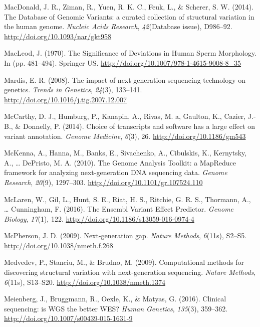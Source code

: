 \documentclass[12pt,twoside]{reedthesis}
\theoremstyle{definition}
\theoremstyle{definition}
\theoremstyle{remark}
\begin{document}
  \hypertarget{ref-MacDonald2014}{}
  MacDonald, J. R., Ziman, R., Yuen, R. K. C., Feuk, L., \& Scherer, S. W.
  (2014). The Database of Genomic Variants: a curated collection of
  structural variation in the human genome. \emph{Nucleic Acids Research},
  \emph{42}(Database issue), D986--92.
  \url{http://doi.org/10.1093/nar/gkt958}
  
  \hypertarget{ref-MacLeod1970}{}
  MacLeod, J. (1970). The Significance of Deviations in Human Sperm
  Morphology. In (pp. 481--494). Springer US.
  \url{http://doi.org/10.1007/978-1-4615-9008-8_35}
  
  \hypertarget{ref-Mardis2008}{}
  Mardis, E. R. (2008). The impact of next-generation sequencing
  technology on genetics. \emph{Trends in Genetics}, \emph{24}(3),
  133--141. \url{http://doi.org/10.1016/j.tig.2007.12.007}
  
  \hypertarget{ref-McCarthy2014}{}
  McCarthy, D. J., Humburg, P., Kanapin, A., Rivas, M. a, Gaulton, K.,
  Cazier, J.-B., \& Donnelly, P. (2014). Choice of transcripts and
  software has a large effect on variant annotation. \emph{Genome
  Medicine}, \emph{6}(3), 26. \url{http://doi.org/10.1186/gm543}
  
  \hypertarget{ref-McKenna2010}{}
  McKenna, A., Hanna, M., Banks, E., Sivachenko, A., Cibulskis, K.,
  Kernytsky, A., \ldots{} DePristo, M. A. (2010). The Genome Analysis
  Toolkit: a MapReduce framework for analyzing next-generation DNA
  sequencing data. \emph{Genome Research}, \emph{20}(9), 1297--303.
  \url{http://doi.org/10.1101/gr.107524.110}
  
  \hypertarget{ref-McLaren2016}{}
  McLaren, W., Gil, L., Hunt, S. E., Riat, H. S., Ritchie, G. R. S.,
  Thormann, A., \ldots{} Cunningham, F. (2016). The Ensembl Variant Effect
  Predictor. \emph{Genome Biology}, \emph{17}(1), 122.
  \url{http://doi.org/10.1186/s13059-016-0974-4}
  
  \hypertarget{ref-McPherson2009}{}
  McPherson, J. D. (2009). Next-generation gap. \emph{Nature Methods},
  \emph{6}(11s), S2--S5. \url{http://doi.org/10.1038/nmeth.f.268}
  
  \hypertarget{ref-Medvedev2009}{}
  Medvedev, P., Stanciu, M., \& Brudno, M. (2009). Computational methods
  for discovering structural variation with next-generation sequencing.
  \emph{Nature Methods}, \emph{6}(11s), S13--S20.
  \url{http://doi.org/10.1038/nmeth.1374}
  
  \hypertarget{ref-Meienberg2016}{}
  Meienberg, J., Bruggmann, R., Oexle, K., \& Matyas, G. (2016). Clinical
  sequencing: is WGS the better WES? \emph{Human Genetics}, \emph{135}(3),
  359--362. \url{http://doi.org/10.1007/s00439-015-1631-9}
  
\end{document}
